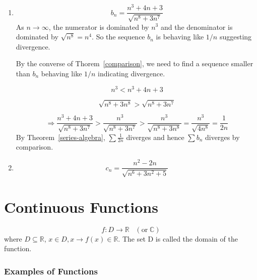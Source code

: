 \documentclass[12pt]{scrbook}
\begin{document}
\begin{enumerate}
\item 
\[ b_n = \frac{n^3 + 4n + 3}{\sqrt{n^8 + 3n^7}} \]
As $n \rightarrow \infty$, the numerator is dominated by $n^3$ and the denominator is dominated by $\sqrt{n^8} = n^4$.  So
the sequence $b_n$ is behaving like $1/n$ suggesting divergence.

By the converse of Thorem~\ref{comparison}, we need to find a sequence smaller than $b_n$ behaving like $1/n$ indicating
divergence.

\[ n^3 < n^3 + 4n + 3 \]

\[ \sqrt{n^8 + 3n^8} > \sqrt{n^8 + 3n^7} \]

\[  \Rightarrow \frac{n^3 + 4n + 3}{\sqrt{n^8 + 3n^7}}  > \frac{n^3}{\sqrt{n^8 + 3n^7}} 
> \frac{n^3}{\sqrt{n^8 + 3n^8}} = \frac{n^3}{\sqrt{4n^8}} = \frac{1}{2n} \]
By Theorem~\ref{series-algebra}, $\sum \frac{1}{2n}$ diverges and hence $\sum b_n$ diverges by comparison.

\item
\[ c_n = \frac{n^2 - 2n}{\sqrt{n^6 + 3n^2 + 5}} \]



\end{enumerate}




\chapter{Continuous Functions}

\[ f : D \rightarrow \mathbb{R} \;\;\; (\text{or} \; \mathbb{C}) \] 
where $D \subseteq \mathbb{R} $,  $x \in D, x \rightarrow f(x) \in \mathbb{R} $.
The set D is called the domain of the function.

\subsection{Examples of Functions}
\end{document}
